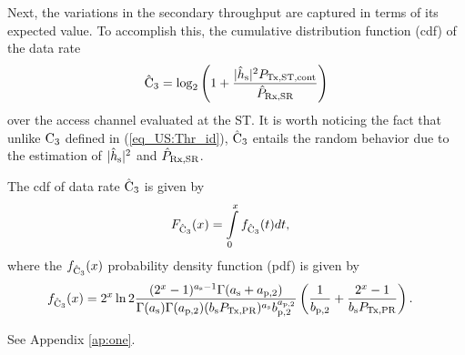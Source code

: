 Next, the variations in the secondary throughput are captured in terms of its expected value. To accomplish this, the cumulative distribution function (cdf) of the data rate%
\begin{align}
\hat{\text{{C}}}_{\text{3}}  = \log_2 \left(1 + \frac{|\hat{h}_{\text{s}}|^2 P_{\text{Tx,ST,cont}}}{\hat{P}_{\text{Rx,SR}}} \right) \label{eq_US:eca}
\end{align}
over the access channel evaluated at the ST. It is worth noticing the fact that unlike $\text{C}_{\text{3}}$ defined in (\ref{eq_US:Thr_id}), $\hat{\text{{C}}}_{\text{3}}$ entails the random behavior due to the estimation of $|\hat{h}_{\text{s}}|^2$ and $\hat{P}_{\text{Rx,SR}}$.
\begin{lemma} \label{lm_US:lm5}
\normalfont 
The cdf of data rate $\hat{\text{{C}}}_{\text{3}}$ is given by
\begin{align}
F_{\hat{\text{{C}}}_{\text{3}}}(x) &= \int\limits_{0}^{x} f_{\hat{\text{{C}}}_{\text{3}}}(t) dt, \label{eq_US:dis_C} 
\end{align}
where the $f_{\hat{\text{{C}}}_{\text{3}}}(x)$ probability density function (pdf) is given by 
\begin{align}
f_{\hat{\text{{C}}}_{\text{3}}}(x) &= 2^x \ln 2 \frac{(2^x - 1)^{a_{\text{s}} - 1} \Gamma(a_{\text{s}} + a_{\text{p,2}})}{\Gamma(a_{\text{s}}) \Gamma(a_{\text{p,2}}) (b_{\text{s}} P_{\text{Tx,PR}}) ^{a_{\text{s}}} b_{\text{p,2}}^{a_{\text{p,2}}}} \left(\frac{1}{b_{\text{p,2}}} + \frac{2^x - 1}{b_{\text{s}} P_{\text{Tx,PR}}}\right). \label{eq_US:den_C}
\end{align}
\end{lemma}
\begin{IEEEproof}
See Appendix \ref{ap:one}.
\end{IEEEproof}

